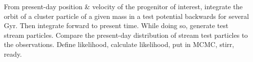 From present-day position \& velocity of the progenitor of interest, integrate the orbit of a cluster particle of a given mass in a test potential backwards for several Gyr. Then integrate forward to present time. While doing so, generate test stream particles. Compare the present-day distribution of stream test particles to the observations. Define likelihood, calculate likelihood, put in MCMC, stirr, ready.